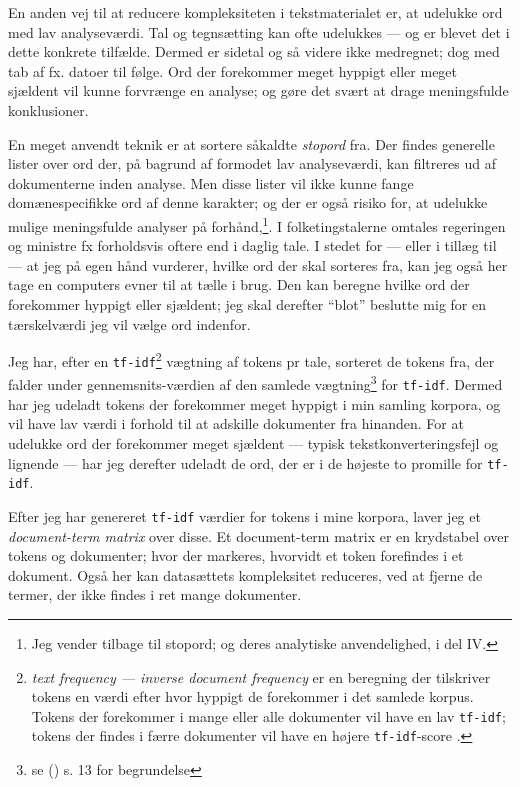 En anden vej til at reducere kompleksiteten i tekstmaterialet er, at udelukke ord med lav analyseværdi.
Tal og tegnsætting kan ofte udelukkes — og er blevet det i dette konkrete tilfælde.
Dermed er sidetal og så videre ikke medregnet; dog med tab af fx. datoer til følge.
Ord der forekommer meget hyppigt eller meget sjældent vil kunne forvrænge en analyse; og gøre det svært at drage meningsfulde konklusioner.

En meget anvendt teknik er at sortere såkaldte \textit{stopord} fra.
Der findes generelle lister over ord der, på bagrund af formodet lav analyseværdi, kan filtreres ud af dokumenterne inden analyse.
Men disse lister vil ikke kunne fange domænespecifikke ord af denne karakter; og der er også risiko for, at udelukke mulige meningsfulde analyser på forhånd,\autocite[s. 27]{manningIntroductionInformationRetrieval2008}\footnote{Jeg vender tilbage til stopord;
og deres analytiske anvendelighed, i del IV.}.
I folketingstalerne omtales regeringen og ministre fx forholdsvis oftere end i daglig tale.
I stedet for — eller i tillæg til — at jeg på egen hånd vurderer, hvilke ord der skal sorteres fra, kan jeg også her tage en computers evner til at tælle i brug.
Den kan beregne hvilke ord der forekommer hyppigt eller sjældent; jeg skal derefter “blot” beslutte mig for en tærskelværdi jeg vil vælge ord indenfor.

Jeg har, efter en \texttt{tf-idf}\footnote{\textit{text frequency — inverse document frequency} er en beregning der tilskriver tokens en værdi efter hvor hyppigt de forekommer i det samlede korpus.
  Tokens der forekommer i mange eller alle dokumenter vil have en lav \texttt{tf-idf}; tokens der findes i færre dokumenter vil have en højere \texttt{tf-idf}-score \autocite[s. 29]{silge2017text}.} vægtning af tokens pr tale, sorteret de tokens fra, der falder under gennemsnits-værdien af den samlede vægtning\footnote{se \citeauthor{grunTopicmodelsPackageFitting2011} (\citeyear{grunTopicmodelsPackageFitting2011}) s. 13 for begrundelse} for \texttt{tf-idf}.
Dermed har jeg udeladt tokens der forekommer meget hyppigt i min samling korpora, og vil have lav værdi i forhold til at adskille dokumenter fra hinanden.
For at udelukke ord der forekommer meget sjældent — typisk tekstkonverteringsfejl og lignende — har jeg derefter udeladt de ord, der er i de højeste to promille for \texttt{tf-idf}.

Efter jeg har genereret \texttt{tf-idf} værdier for tokens i mine korpora, laver jeg et \textit{document-term matrix} over disse.
Et document-term matrix er en krydstabel over tokens og dokumenter; hvor der markeres, hvorvidt et token forefindes i et dokument.
Også her kan datasættets kompleksitet reduceres, ved at fjerne de termer, der ikke findes i ret mange dokumenter.

